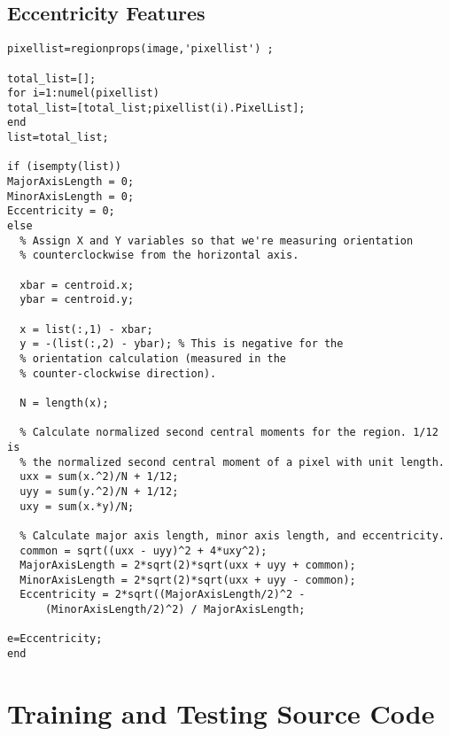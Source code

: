 \subsection*{Eccentricity Features}
\begin{lstlisting}
pixellist=regionprops(image,'pixellist') ;

total_list=[];
for i=1:numel(pixellist)
total_list=[total_list;pixellist(i).PixelList];
end
list=total_list;

if (isempty(list))
MajorAxisLength = 0;
MinorAxisLength = 0;
Eccentricity = 0;
else
  % Assign X and Y variables so that we're measuring orientation
  % counterclockwise from the horizontal axis.

  xbar = centroid.x;
  ybar = centroid.y;

  x = list(:,1) - xbar;
  y = -(list(:,2) - ybar); % This is negative for the
  % orientation calculation (measured in the
  % counter-clockwise direction).

  N = length(x);

  % Calculate normalized second central moments for the region. 1/12 is
  % the normalized second central moment of a pixel with unit length.
  uxx = sum(x.^2)/N + 1/12;
  uyy = sum(y.^2)/N + 1/12;
  uxy = sum(x.*y)/N;

  % Calculate major axis length, minor axis length, and eccentricity.
  common = sqrt((uxx - uyy)^2 + 4*uxy^2);
  MajorAxisLength = 2*sqrt(2)*sqrt(uxx + uyy + common);
  MinorAxisLength = 2*sqrt(2)*sqrt(uxx + uyy - common);
  Eccentricity = 2*sqrt((MajorAxisLength/2)^2 -
      (MinorAxisLength/2)^2) / MajorAxisLength;

e=Eccentricity;
end
\end{lstlisting}
\section{Training and Testing Source Code}
